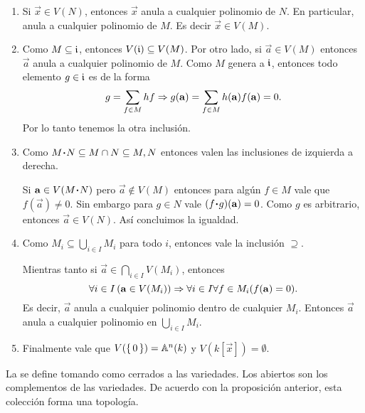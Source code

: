 \documentclass[12pt]{memoir}
\begin{document}
\begin{ptcbp}
\begin{enumerate}
  \item Si $\vec x\in V(N)$, entonces $\vec{x}$ anula a cualquier polinomio de $N$. En particular, anula a cualquier polinomio de $M$. Es decir $\vec{x}\in V(M)$.
  \item Como $M\subseteq\mathfrak{i}$, entonces $V(\mathfrak{i})\subseteq V(M)$. Por otro lado, si $\vec{a}\in V(M)$ entonces $\vec{a}$ anula a cualquier polinomio de $M$. Como $M$ genera a $\mathfrak{i}$, entonces todo elemento $g\in\mathfrak{i}$ es de la forma
  $$g=\sum_{f\in M} hf\Rightarrow g(\mathbf{a})=\sum_{f\in M}h(\mathbf{a})f(\mathbf{a})=0.$$
  Por lo tanto tenemos la otra inclusión.
  \item Como $M\.N\subseteq M\cap N\subseteq M,N$ entonces valen las inclusiones de izquierda a derecha.\par 
  Si $\vec a\in V(M\.N)$ pero $\vec a\not\in V(M)$ entonces para algún $f\in M$ vale que $f(\vec{a})\neq 0$. Sin embargo para $g\in N$ vale $(f\.g)(\vec{a})=0$. Como $g$ es arbitrario, entonces $\vec a\in V(N)$. Así concluimos la igualdad.
  \item Como $M_i\subseteq\bigcup_{i\in I}M_i$ para todo $i$, entonces vale la inclusión $\supseteq$.\par 
  Mientras tanto si $\vec{a}\in\bigcap_{i\in I}V(M_i)$, entonces
  $$\forall i\in I\left(\mathbf{a}\in V(M_i)\right)\Rightarrow\forall i\in I\forall f\in M_i(f(\mathbf{a})=0).$$
  Es decir, $\vec{a}$ anula a cualquier polinomio dentro de cualquier $M_i$. Entonces $\vec{a}$ anula a cualquier polinomio en $\bigcup_{i\in I}M_i$. 
  \item Finalmente vale que $V(\{\,0\,\})=\mathbb{A}^n(k)$ y $V(k[\vec{x}])=\emptyset$.
\end{enumerate}
\end{ptcbp}

\begin{Def}
  La  se define tomando como cerrados a las variedades. Los abiertos son los complementos de las variedades. De acuerdo con la proposición anterior, esta colección forma una topología.
\end{Def}
\end{document}

